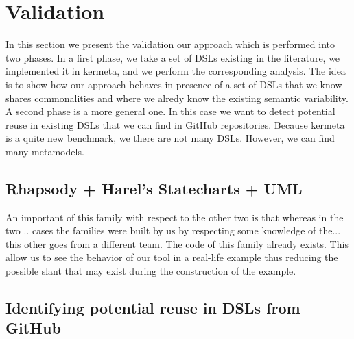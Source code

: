 \section{Validation}
\label{sec:validation}

In this section we present the validation our approach which is performed into two phases. In a first phase, we take a set of DSLs existing in the literature, we implemented it in kermeta, and we perform the corresponding analysis. The idea is to show how our approach behaves in presence of a set of DSLs that we know shares commonalities and where we alredy know the existing semantic variability. A second phase is a more general one. In this case we want to detect potential reuse in existing DSLs that we can find in GitHub repositories. Because kermeta is a quite new benchmark, we there are not many DSLs. However, we can find many metamodels. 

\subsection{Rhapsody + Harel's Statecharts + UML}

An important of this family with respect to the other two is that whereas in the two .. cases the families were built by us by respecting some knowledge of the... this other goes from a different team. The code of this family already exists. This allow us to see the behavior of our tool in a real-life example thus reducing the possible slant that may exist during the construction of the example. 

\subsection{Identifying potential reuse in DSLs from GitHub}


